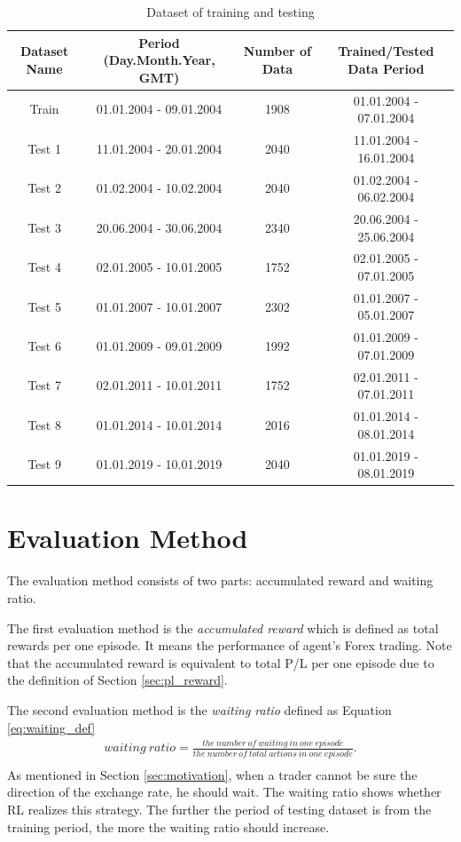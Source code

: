 \begin{table}[htb]
  \centering
  \caption{Dataset of training and testing}
  \label{tb:dataset}
  \begin{tabular}{|c|c|c|c|}
  \hline
    Dataset Name & Period (Day.Month.Year, GMT)  & Number of Data & Trained/Tested Data Period \\
  \hline
    Train        & 01.01.2004 - 09.01.2004  & 1908           & 01.01.2004 - 07.01.2004  \\
    Test 1       & 11.01.2004 - 20.01.2004  & 2040           & 11.01.2004 - 16.01.2004  \\
    Test 2       & 01.02.2004 - 10.02.2004  & 2040           & 01.02.2004 - 06.02.2004  \\
    Test 3       & 20.06.2004 - 30.06.2004  & 2340           & 20.06.2004 - 25.06.2004  \\
    Test 4       & 02.01.2005 - 10.01.2005  & 1752           & 02.01.2005 - 07.01.2005  \\
    Test 5       & 01.01.2007 - 10.01.2007  & 2302           & 01.01.2007 - 05.01.2007  \\
    Test 6       & 01.01.2009 - 09.01.2009  & 1992           & 01.01.2009 - 07.01.2009  \\
    Test 7       & 02.01.2011 - 10.01.2011  & 1752           & 02.01.2011 - 07.01.2011  \\
    Test 8       & 01.01.2014 - 10.01.2014  & 2016           & 01.01.2014 - 08.01.2014  \\
    Test 9       & 01.01.2019 - 10.01.2019  & 2040           & 01.01.2019 - 08.01.2019  \\
  \hline
  \end{tabular}
\end{table}

\section{Evaluation Method}
\label{sec:evaluation}
The evaluation method consists of two parts: accumulated reward and waiting ratio. 

The first evaluation method is the {\it accumulated reward} which is defined as total rewards per one episode. It means the performance of agent's Forex trading. Note that the accumulated reward is equivalent to total P/L per one episode due to the definition of Section \ref{sec:pl_reward}.

The second evaluation method is the {\it waiting ratio} defined as Equation \ref{eq:waiting_def}
\begin{equation}
  \label{eq:waiting_def}
  \begin{array}{l}
    waiting \ ratio = \frac{the \ number \ of \ waiting \ in \ one \ episode}{the \ number \ of \ total \ actions \ in \ one \ episode}. \\
  \end{array}
\end{equation}
As mentioned in Section \ref{sec:motivation}, when a trader cannot be sure the direction of the exchange rate, he should wait. The waiting ratio shows whether RL realizes this strategy. The further the period of testing dataset is from the training period, the more the waiting ratio should increase.


